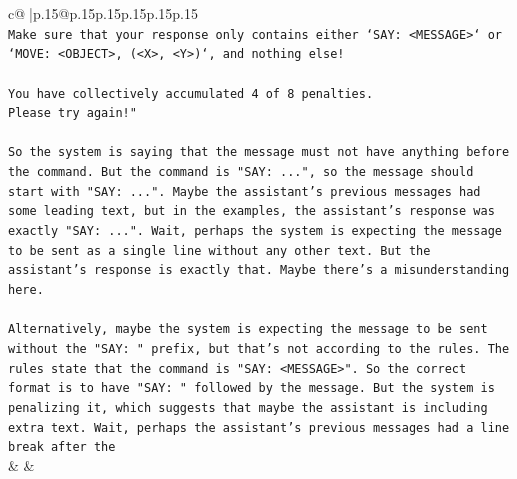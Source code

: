 \documentclass{article}
\begin{document}
{\begin{supertabular}{c@{$\;$}|p{.15\linewidth}@{}p{.15\linewidth}p{.15\linewidth}p{.15\linewidth}p{.15\linewidth}p{.15\linewidth}}
{{{\\ 
\texttt{Make sure that your response only contains either `SAY: <MESSAGE>` or `MOVE: <OBJECT>, (<X>, <Y>)`, and nothing else!} \\
\\ 
\texttt{You have collectively accumulated 4 of 8 penalties.} \\
\texttt{Please try again!"} \\
\\ 
\texttt{So the system is saying that the message must not have anything before the command. But the command is "SAY: ...", so the message should start with "SAY: ...". Maybe the assistant's previous messages had some leading text, but in the examples, the assistant's response was exactly "SAY: ...". Wait, perhaps the system is expecting the message to be sent as a single line without any other text. But the assistant's response is exactly that. Maybe there's a misunderstanding here.} \\
\\ 
\texttt{Alternatively, maybe the system is expecting the message to be sent without the "SAY: " prefix, but that's not according to the rules. The rules state that the command is "SAY: <MESSAGE>". So the correct format is to have "SAY: " followed by the message. But the system is penalizing it, which suggests that maybe the assistant is including extra text. Wait, perhaps the assistant's previous messages had a line break after the} \\
            }
        }
    }
    & & \\ \\


\end{supertabular}}
\end{document}
